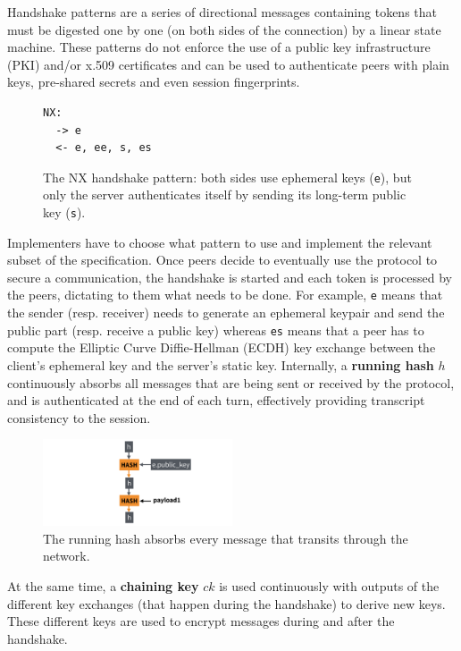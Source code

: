 \documentclass{article}
\begin{document}
Handshake patterns are a series of directional messages containing tokens that must be digested one by one (on both sides of the connection) by a linear state machine. These patterns do not enforce the use of a public key infrastructure (PKI) and/or x.509 certificates and can be used to authenticate peers with plain keys, pre-shared secrets and even session fingerprints.\\

\begin{figure}[H]
\centering
\begin{BVerbatim}
NX:
  -> e
  <- e, ee, s, es
\end{BVerbatim}
\caption{The NX handshake pattern: both sides use ephemeral keys (\texttt{e}), but only the server authenticates itself by sending its long-term public key (\texttt{s}).}
\end{figure}

Implementers have to choose what pattern to use and implement the relevant subset of the specification. Once peers decide to eventually use the protocol to secure a communication, the handshake is started and each token is processed by the peers, dictating to them what needs to be done. For example, \texttt{e} means that the sender (resp. receiver) needs to generate an ephemeral keypair and send the public part (resp. receive a public key) whereas \texttt{es} means that a peer has to compute the Elliptic Curve Diffie-Hellman (ECDH) key exchange between the client's ephemeral key and the server's static key. Internally, a \textbf{running hash} $h$ continuously absorbs all messages that are being sent or received by the protocol, and is authenticated at the end of each turn, effectively providing transcript consistency to the session.

\begin{figure}[H]
\centering
\includegraphics[width=0.5\textwidth]{rwcimg/h.png}
\caption{The running hash absorbs every message that transits through the network.}
\end{figure}

At the same time, a \textbf{chaining key} $ck$ is used continuously with outputs of the different key exchanges (that happen during the handshake) to derive new keys. These different keys are used to encrypt messages during and after the handshake.
\end{document}

